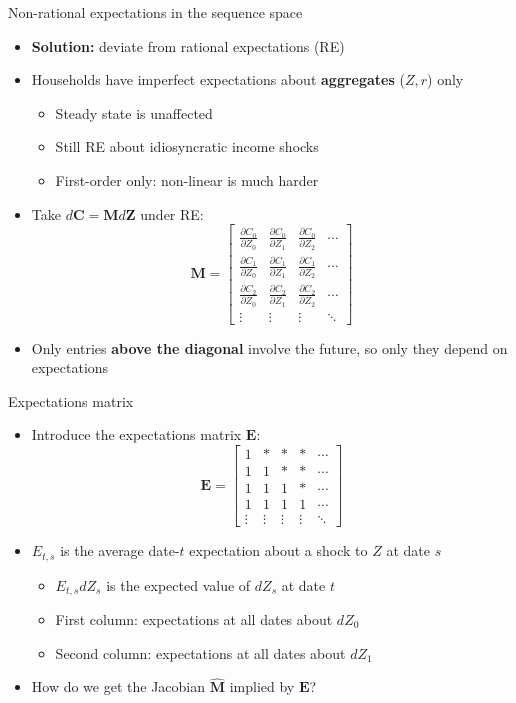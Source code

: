\documentclass[10pt,english]{beamer}
\begin{document}
\begin{frame}{Non-rational expectations in the sequence space}
\begin{itemize}
\item <+->\textbf{Solution:} deviate from rational expectations (RE)
\item <+->Households have imperfect expectations about \textbf{aggregates} ($Z,r$) only
\begin{itemize}
\item Steady state is unaffected
\item Still RE about idiosyncratic income shocks
\item First-order only: non-linear is much harder
\end{itemize}
\item <+->Take $d\boldsymbol{C}=\boldsymbol{M}d\boldsymbol{Z}$ under RE:
\[
\boldsymbol{M}=\begin{bmatrix}\frac{\partial C_{0}}{\partial Z_{0}} & \frac{\partial C_{0}}{\partial Z_{1}} & \frac{\partial C_{0}}{\partial Z_{2}} & \cdots\\
\frac{\partial C_{1}}{\partial Z_{0}} & \frac{\partial C_{1}}{\partial Z_{1}} & \frac{\partial C_{1}}{\partial Z_{2}} & \cdots\\
\frac{\partial C_{2}}{\partial Z_{0}} & \frac{\partial C_{2}}{\partial Z_{1}} & \frac{\partial C_{2}}{\partial Z_{2}} & \cdots\\
\vdots & \vdots & \vdots & \ddots
\end{bmatrix}
\]
\item <+->Only entries \textbf{above the diagonal} involve the future, so only they depend on expectations
\end{itemize}
\end{frame}
%
\begin{frame}{Expectations matrix}
\begin{itemize}
\item <+->Introduce the expectations matrix $\boldsymbol{E}$:
\[
\boldsymbol{E}=\begin{bmatrix}1 & * & * & * & \cdots\\
1 & 1 & * & * & \cdots\\
1 & 1 & 1 & * & \cdots\\
1 & 1 & 1 & 1 & \cdots\\
\vdots & \vdots & \vdots & \vdots & \ddots
\end{bmatrix}
\]
\item <+->$E_{t,s}$ is the average date-$t$ expectation about a shock to $Z$ at date $s$
\begin{itemize}
\item $E_{t,s}dZ_{s}$ is the expected value of $dZ_{s}$ at date $t$
\item First column: expectations at all dates about $dZ_{0}$
\item Second column: expectations at all dates about $dZ_{1}$
\end{itemize}
\item <+->How do we get the Jacobian $\hat{\boldsymbol{M}}$ implied by $\boldsymbol{E}$?
\end{itemize}
\end{frame}
\end{document}
